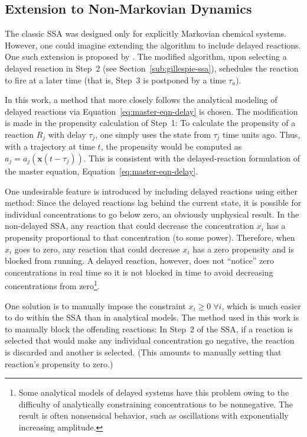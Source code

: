 \documentclass[english,letterpaper,12pt]{article}
\renewcommand{\vec}[1]{\ensuremath{\mathbf{#1}}}
\newcommand{\delaytime}{\ensuremath{\tau}}
\begin{document}
\begin{doublespacing}


\subsection{Extension to Non-Markovian Dynamics} %
\label{sub:non-markovian}

The classic SSA was designed only for explicitly Markovian chemical systems. However, one could imagine extending the algorithm to include delayed reactions. One such extension is proposed by \cite{delay-oscillations}. The modified algorithm, upon selecting a delayed reaction in Step~2 (see Section~\ref{sub:gillespie-ssa}), schedules the reaction to fire at a later time (that is, Step~3 is postponed by a time $\tau_a$). 

In this work, a method that more closely follows the analytical modeling of delayed reactions via Equation~\eqref{eq:master-eqn-delay} is chosen. The modification is made in the propensity calculation of Step~1: To calculate the propensity of a reaction $R_j$ with delay $\delaytime_j$, one simply uses the state from $\delaytime_j$ time units ago. Thus, with a trajectory at time $t$, the propensity would be computed as $a_j = a_j\left(\vec{x}(t - \delaytime_j)\right)$. This is consistent with the delayed-reaction formulation of the master equation, Equation~\eqref{eq:master-eqn-delay}.

One undesirable feature is introduced by including delayed reactions using either method: Since the delayed reactions lag behind the current state, it is possible for individual concentrations to go below zero, an obviously unphysical result. In the non-delayed SSA, any reaction that could decrease the concentration $x_i$ has a propensity proportional to that concentration (to some power). Therefore, when $x_i$ goes to zero, any reaction that could decrease $x_i$ has a zero propensity and is blocked from running. A delayed reaction, however, does not ``notice'' zero concentrations in real time so it is not blocked in time to avoid decreasing concentrations from zero\footnote{Some analytical models of delayed systems have this problem owing to the difficulty of analytically constraining concentrations to be nonnegative. The result is often nonsensical behavior, such as oscillations with exponentially increasing amplitude.}.

One solution is to manually impose the constraint $x_i \geq 0\; \forall i$, which is much easier to do within the SSA than in analytical models. The method used in this work is to manually block the offending reactions: In Step~2 of the SSA, if a reaction is selected that would make any individual concentration go negative, the reaction is discarded and another is selected. (This amounts to manually setting that reaction's propensity to zero.) 


\end{doublespacing}
\end{document}
